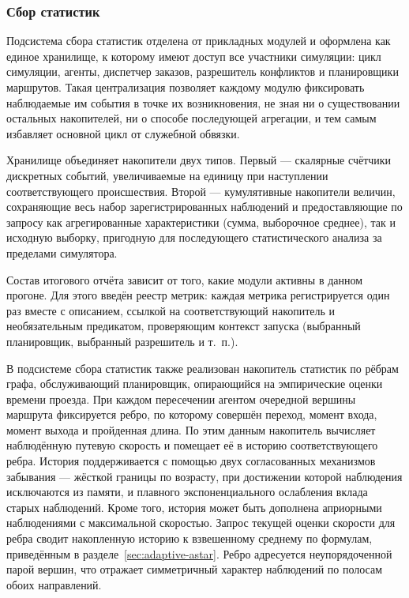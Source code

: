 \subsubsection{Сбор статистик}
\label{sec:stats}

Подсистема сбора статистик отделена от прикладных модулей и оформлена как единое хранилище, к которому 
имеют доступ все участники симуляции: цикл симуляции, агенты, диспетчер заказов, разрешитель 
конфликтов и планировщики маршрутов. Такая централизация позволяет каждому модулю фиксировать 
наблюдаемые им события в точке их возникновения, не зная ни о существовании остальных накопителей, 
ни о способе последующей агрегации, и тем самым избавляет основной цикл от служебной обвязки.

Хранилище объединяет накопители двух типов. Первый --- скалярные счётчики дискретных событий, 
увеличиваемые на единицу при наступлении соответствующего происшествия. Второй --- кумулятивные 
накопители величин, сохраняющие весь набор зарегистрированных наблюдений и предоставляющие по 
запросу как агрегированные характеристики (сумма, выборочное среднее), так и исходную выборку, 
пригодную для последующего статистического анализа за пределами симулятора.

Состав итогового отчёта зависит от того, какие модули активны в данном прогоне. Для этого введён 
реестр метрик: каждая метрика регистрируется один раз вместе с описанием, ссылкой на соответствующий
накопитель и необязательным предикатом, проверяющим контекст запуска 
(выбранный планировщик, выбранный разрешитель и т.~п.).

В подсистеме сбора статистик также реализован накопитель статистик по рёбрам графа, обслуживающий 
планировщик, опирающийся на эмпирические оценки времени проезда. При каждом пересечении агентом 
очередной вершины маршрута фиксируется ребро, по которому совершён переход, момент входа, момент 
выхода и пройденная длина. По этим данным накопитель вычисляет наблюдённую путевую скорость и 
помещает её в историю соответствующего ребра. История поддерживается с помощью двух согласованных 
механизмов забывания --- жёсткой границы по возрасту, при достижении которой наблюдения исключаются 
из памяти, и плавного экспоненциального ослабления вклада старых наблюдений. Кроме того, история 
может быть дополнена априорными наблюдениями с максимальной скоростью. 
Запрос текущей оценки скорости для ребра сводит накопленную историю к взвешенному среднему по 
формулам, приведённым в разделе~\ref{sec:adaptive-astar}. Ребро адресуется неупорядоченной 
парой вершин, что отражает симметричный характер наблюдений по полосам обоих направлений.

